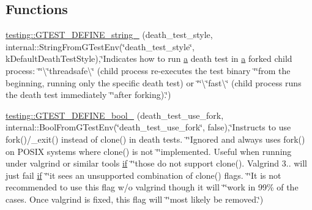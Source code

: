 \subsection*{Functions}
\begin{DoxyCompactItemize}
\item 
\hyperlink{namespacetesting_ad93c9ec89517d047ed323b79d96df251}{testing\+::\+G\+T\+E\+S\+T\+\_\+\+D\+E\+F\+I\+N\+E\+\_\+string\+\_\+} (death\+\_\+test\+\_\+style, internal\+::\+String\+From\+G\+Test\+Env(\char`\"{}death\+\_\+test\+\_\+style\char`\"{}, k\+Default\+Death\+Test\+Style),\char`\"{}Indicates how to run \hyperlink{_07copy_08_2_read_camera_model_8m_a551a3d351eadcc0b9b1a2f24f0fb5ea0}{a} death test in \hyperlink{_07copy_08_2_read_camera_model_8m_a551a3d351eadcc0b9b1a2f24f0fb5ea0}{a} forked child process\+: \char`\"{}\char`\"{}\textbackslash{}\char`\"{}threadsafe\textbackslash{}\char`\"{} (child process re-\/executes the test binary \char`\"{}\char`\"{}from the beginning, running only the specific death test) or \char`\"{}\char`\"{}\textbackslash{}\char`\"{}fast\textbackslash{}\char`\"{} (child process runs the death test immediately \char`\"{}\char`\"{}after forking).\char`\"{})
\item 
\hyperlink{namespacetesting_afee59458b05682d57d3a389e0903bc01}{testing\+::\+G\+T\+E\+S\+T\+\_\+\+D\+E\+F\+I\+N\+E\+\_\+bool\+\_\+} (death\+\_\+test\+\_\+use\+\_\+fork, internal\+::\+Bool\+From\+G\+Test\+Env(\char`\"{}death\+\_\+test\+\_\+use\+\_\+fork\char`\"{}, false),\char`\"{}Instructs to use fork()/\+\_\+exit() instead of clone() in death tests. \char`\"{}\char`\"{}Ignored and always uses fork() on P\+O\+S\+IX systems where clone() is not \char`\"{}\char`\"{}implemented. Useful when running under valgrind or similar tools \hyperlink{jquery_8js_a42cbfadee2b4749e8f699ea8d745a0e4}{if} \char`\"{}\char`\"{}those do not support clone(). Valgrind 3.. will just fail \hyperlink{jquery_8js_a42cbfadee2b4749e8f699ea8d745a0e4}{if} \char`\"{}\char`\"{}it sees an unsupported combination of clone() flags. \char`\"{}\char`\"{}It is not recommended to use this flag w/o valgrind though it will \char`\"{}\char`\"{}work in 99\% of the cases. Once valgrind is fixed, this flag will \char`\"{}\char`\"{}most likely be removed.\char`\"{})
\item 

\end{DoxyCompactItemize}
